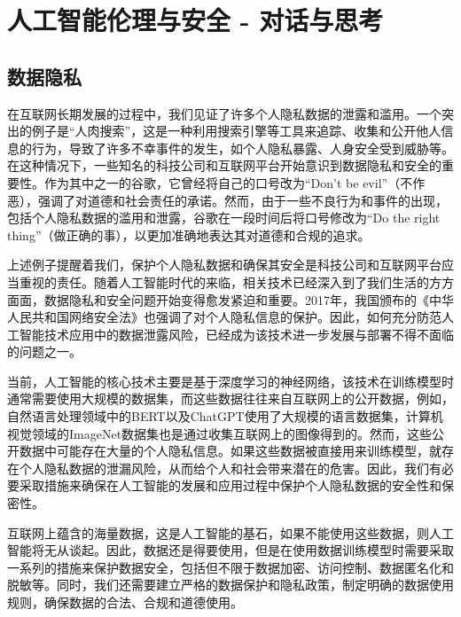 \setchapterpreamble[u]{\margintoc}
\chapter[人工智能伦理与安全 - 对话与思考]{人工智能伦理与安全 - 对话与思考 \footnotemark[0]}

 
\section{数据隐私}

在互联网长期发展的过程中，我们见证了许多个人隐私数据的泄露和滥用。一个突出的例子是“人肉搜索”，这是一种利用搜索引擎等工具来追踪、收集和公开他人信息的行为，导致了许多不幸事件的发生，如个人隐私暴露、人身安全受到威胁等。在这种情况下，一些知名的科技公司和互联网平台开始意识到数据隐私和安全的重要性。作为其中之一的谷歌，它曾经将自己的口号改为“Don't be evil”（不作恶），强调了对道德和社会责任的承诺。然而，由于一些不良行为和事件的出现，包括个人隐私数据的滥用和泄露，谷歌在一段时间后将口号修改为“Do the right thing”（做正确的事），以更加准确地表达其对道德和合规的追求。

上述例子提醒着我们，保护个人隐私数据和确保其安全是科技公司和互联网平台应当重视的责任。随着人工智能时代的来临，相关技术已经深入到了我们生活的方方面面，数据隐私和安全问题开始变得愈发紧迫和重要。2017年，我国颁布的《中华人民共和国网络安全法》也强调了对个人隐私信息的保护。因此，如何充分防范人工智能技术应用中的数据泄露风险，已经成为该技术进一步发展与部署不得不面临的问题之一。

当前，人工智能的核心技术主要是基于深度学习的神经网络，该技术在训练模型时通常需要使用大规模的数据集，而这些数据往往来自互联网上的公开数据，例如，自然语言处理领域中的BERT以及ChatGPT使用了大规模的语言数据集，计算机视觉领域的ImageNet数据集也是通过收集互联网上的图像得到的。然而，这些公开数据中可能存在大量的个人隐私信息。如果这些数据被直接用来训练模型，就存在个人隐私数据的泄漏风险，从而给个人和社会带来潜在的危害。因此，我们有必要采取措施来确保在人工智能的发展和应用过程中保护个人隐私数据的安全性和保密性。

互联网上蕴含的海量数据，这是人工智能的基石，如果不能使用这些数据，则人工智能将无从谈起。因此，数据还是得要使用，但是在使用数据训练模型时需要采取一系列的措施来保护数据安全，包括但不限于数据加密、访问控制、数据匿名化和脱敏等。同时，我们还需要建立严格的数据保护和隐私政策，制定明确的数据使用规则，确保数据的合法、合规和道德使用。

